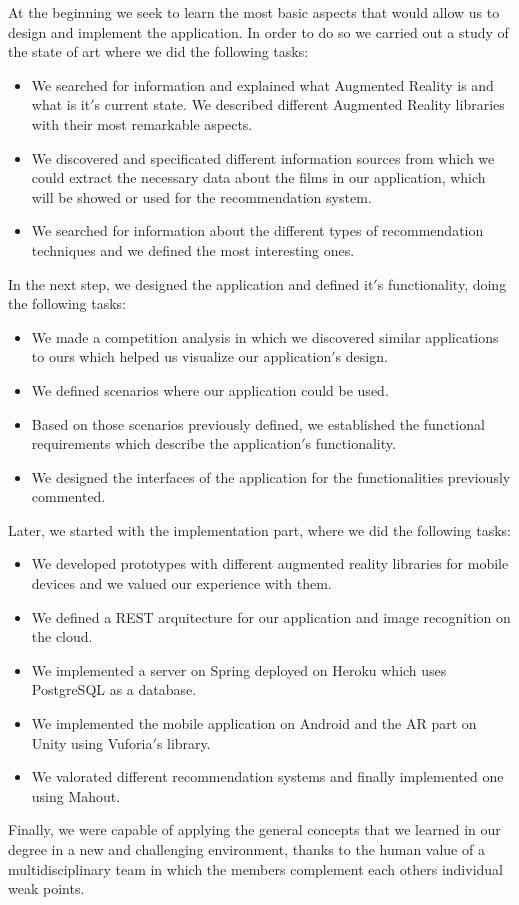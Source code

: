 At the beginning we seek to learn the most basic aspects that would allow us to design
and implement the application. In order to do so we carried out a study of the state of art where we did the following tasks:
\begin{itemize}  
    \item We searched for information and explained what Augmented Reality is and what is it$'$s current state. We described different
     Augmented Reality libraries with their most remarkable aspects.
    \item We discovered and specificated different information sources from which we could extract the necessary data about the films in our application, which will be showed or used for the recommendation system.
    \item We searched for information about the different types of recommendation techniques and we defined the most interesting ones.
\end{itemize}

In the next step, we designed the application and defined it$'$s functionality, doing the following tasks:
\begin{itemize}
    \item We made a competition analysis in which we discovered similar applications to ours which helped us visualize our application$'$s design.
    \item We defined scenarios where our application could be used.
    \item Based on those scenarios previously defined, we established the functional requirements which describe the application$'$s functionality.
    \item We designed the interfaces of the application for the functionalities previously commented.
\end{itemize}

Later, we started with the implementation part, where we did the following tasks:
\begin{itemize}
    \item We developed prototypes with different augmented reality libraries for mobile devices and we valued our experience with them.
    \item We defined a REST arquitecture for our application and image recognition on the cloud.
    \item We implemented a server on Spring deployed on Heroku which uses PostgreSQL as a database.
    \item We implemented the mobile application on Android and the AR part on Unity using Vuforia$'$s library.
    \item We valorated different recommendation systems and finally implemented one using Mahout.
\end{itemize}

Finally, we were capable of applying the general concepts that we learned in our degree in a new and challenging environment, thanks to the human value of a multidisciplinary team in which the members complement each others individual weak points.